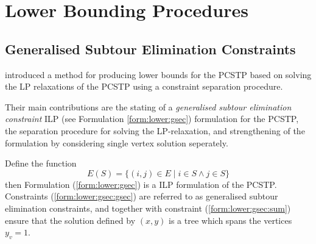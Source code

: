 

\clearpage




\section{Lower Bounding Procedures}
\label{sec:solving:lower}

\subsection{Generalised Subtour Elimination Constraints}
\label{sec:lower:gsec}
\citet{lucena2004strong} introduced a method for producing lower bounds for the PCSTP based on solving
the LP relaxations of the PCSTP using a constraint separation procedure.

Their main contributions
are the stating of a \textit{generalised subtour elimination constraint} ILP (see Formulation \ref{form:lower:gsec}) formulation
for the PCSTP, the separation procedure for solving the LP-relaxation, and strengthening of the formulation by considering
single vertex solution seperately.

Define the function
$$E(S) = \{(i,j) \in E \mid i \in S \wedge j \in S\}$$
then Formulation (\ref{form:lower:gsec}) is a ILP formulation of the PCSTP. Constraints (\ref{form:lower:gsec:gsec}) are
referred to as generalised subtour elimination constraints, and together with constraint (\ref{form:lower:gsec:sum})
ensure that the solution defined by $(x, y)$ is a tree which spans the vertices $y_v = 1$.

